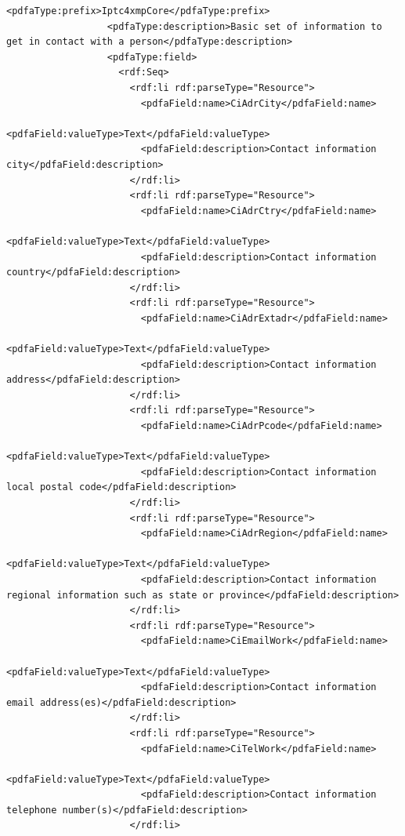 \begin{lstlisting}[style=myXML,
caption={Second part of the XML metadata embedded in a PDF file (some reformatting has been done to fit the text in the boarders)}, label={lst:pdfinfoOutputPart2}]
                  <pdfaType:prefix>Iptc4xmpCore</pdfaType:prefix>
                  <pdfaType:description>Basic set of information to get in contact with a person</pdfaType:description>
                  <pdfaType:field>
                    <rdf:Seq>
                      <rdf:li rdf:parseType="Resource">
                        <pdfaField:name>CiAdrCity</pdfaField:name>
                        <pdfaField:valueType>Text</pdfaField:valueType>
                        <pdfaField:description>Contact information city</pdfaField:description>
                      </rdf:li>
                      <rdf:li rdf:parseType="Resource">
                        <pdfaField:name>CiAdrCtry</pdfaField:name>
                        <pdfaField:valueType>Text</pdfaField:valueType>
                        <pdfaField:description>Contact information country</pdfaField:description>
                      </rdf:li>
                      <rdf:li rdf:parseType="Resource">
                        <pdfaField:name>CiAdrExtadr</pdfaField:name>
                        <pdfaField:valueType>Text</pdfaField:valueType>
                        <pdfaField:description>Contact information address</pdfaField:description>
                      </rdf:li>
                      <rdf:li rdf:parseType="Resource">
                        <pdfaField:name>CiAdrPcode</pdfaField:name>
                        <pdfaField:valueType>Text</pdfaField:valueType>
                        <pdfaField:description>Contact information local postal code</pdfaField:description>
                      </rdf:li>
                      <rdf:li rdf:parseType="Resource">
                        <pdfaField:name>CiAdrRegion</pdfaField:name>
                        <pdfaField:valueType>Text</pdfaField:valueType>
                        <pdfaField:description>Contact information regional information such as state or province</pdfaField:description>
                      </rdf:li>
                      <rdf:li rdf:parseType="Resource">
                        <pdfaField:name>CiEmailWork</pdfaField:name>
                        <pdfaField:valueType>Text</pdfaField:valueType>
                        <pdfaField:description>Contact information email address(es)</pdfaField:description>
                      </rdf:li>
                      <rdf:li rdf:parseType="Resource">
                        <pdfaField:name>CiTelWork</pdfaField:name>
                        <pdfaField:valueType>Text</pdfaField:valueType>
                        <pdfaField:description>Contact information telephone number(s)</pdfaField:description>
                      </rdf:li>

\end{lstlisting}
